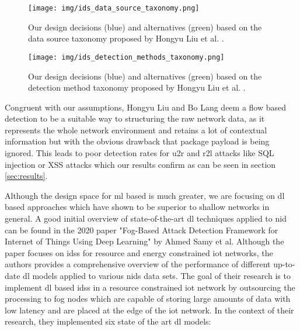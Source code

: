 \begin{figure}[H]
	\centering
	\texttt{[image: img/ids\_data\_source\_taxonomy.png]}
	\caption{Our design decisions (blue) and alternatives (green) based on the data source taxonomy proposed by Hongyu Liu et al. \cite{nid_ml_survey_2019}.}
	\label{fig:stateofart:ids_data_source_taxonomy}
\end{figure}


\begin{figure}[H]
	\centering
	\texttt{[image: img/ids\_detection\_methods\_taxonomy.png]}
	\caption{Our design decisions (blue) and alternatives (green) based on the detection method taxonomy proposed by Hongyu Liu et al. \cite{nid_ml_survey_2019}.}
	\label{fig:stateofart:ids_detection_methods_taxonomy}
\end{figure}

Congruent with our assumptions, Hongyu Liu and Bo Lang deem a flow based detection to be a suitable way to structuring the raw network data, as it represents the whole network environment and retains a lot of contextual information but with the obvious drawback that package payload is being ignored. This leads to poor detection rates for \gls{u2r} and \gls{r2l} attacks like SQL injection or XSS attacks which our results confirm as can be seen in section \ref{sec:results}. \par

Although the design space for \gls{ml} based is much greater, we are focusing on \gls{dl} based approaches which have shown to be superior to shallow networks in general. A good initial overview of state-of-the-art \gls{dl} techniques applied to \gls{nid} can be found in the 2020 paper "Fog-Based Attack Detection Framework for Internet of Things Using Deep Learning" \cite{fog_based_detection_survey_2020} by Ahmed Samy et al. Although the paper focuses on \glspl{ids} for resource and energy constrained \gls{iot} networks, the authors provides a comprehensive overview of the performance of different up-to-date \gls{dl} models applied to various \gls{nids} data sets. The goal of their research is to implement \gls{dl} based \glspl{ids} in a resource constrained \gls{iot} network by outsourcing the processing to fog nodes which are capable of storing large amounts of data with low latency and are placed at the edge of the \gls{iot} network. In the context of their research, they implemented six state of the art \gls{dl} models:


